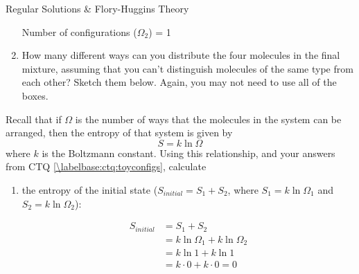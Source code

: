 \begin{activity}{Regular Solutions \& Flory-Huggins Theory}
\begin{ctqs}
\begin{enumerate}
\begin{solution}
{						\vspace{0.1in}
						\centerline{Number of configurations ($\Omega_2$) = 1}
					}
				\end{solution}
			
			\item How many different ways can you distribute the four molecules in the final mixture, assuming that you can't distinguish molecules of the same type from each other?  Sketch them below.  Again, you may not need to use all of the boxes.
			
				\begin{solution}
				\end{solution}
		\end{enumerate}
		
	\question Recall that if $\Omega$ is the number of ways that the molecules in the system can be arranged, then the entropy of that system is given by
		\begin{equation*}
			S = k \ln \Omega
		\end{equation*} 
		where $k$ is the Boltzmann constant.  Using this relationship, and your answers from CTQ \ref{\labelbase:ctq:toyconfigs}, calculate
			
		\begin{enumerate}
			\item the entropy of the initial state ($S_{initial} = S_1 + S_2$, where $S_1 = k\ln \Omega_1$ and $S_2 = k \ln \Omega_2$):
			
				\begin{solution}[1in]
					\begin{align*}
						S_{initial} &= S_1 + S_2 \\
							&= k\ln\Omega_1 + k\ln\Omega_2\\
							&= k \ln 1 + k \ln 1 \\
							&= k\cdot 0 + k\cdot 0 = 0
					\end{align*}
				\end{solution}
				

\end{enumerate}
\end{ctqs}
\end{activity}

